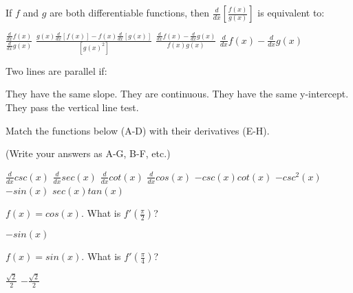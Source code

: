\documentclass[addpoints, 12pt]{exam}%
\newcommand{\spc}{\vspace*{0.5cm}}
\begin{document}
\begin{questions}
\spc

\question[1]

If $f$ and $g$ are both differentiable functions, then $\frac{d}{dx}[\frac{f(x)}{g(x)}]$ is equivalent to:

\begin{choices}
\choice $\frac{\frac{d}{dx}f(x)}{\frac{d}{dx}g(x)}$
\CorrectChoice $\frac{g(x)\frac{d}{dx}[f(x)] - f(x)\frac{d}{dx}[g(x)]}{[g(x)^2]}$
\choice $\frac{\frac{d}{dx}f(x) - \frac{d}{dx}g(x)}{f(x)g(x)}$
\choice $\frac{d}{dx}f(x) - \frac{d}{dx}g(x)$
\end{choices}

\spc

\question[1]

Two lines are parallel if:

\begin{choices}
\CorrectChoice They have the same slope.
\choice They are continuous.
\choice They have the same y-intercept.
\choice They pass the vertical line test. 
\end{choices}

\spc

\question[1]

Match the functions below (A-D) with their derivatives (E-H). 

(Write your answers as A-G, B-F, etc.)

\begin{multicols}{2}
\begin{choices}
\choice $\frac{d}{dx}csc(x)$
\choice $\frac{d}{dx}sec(x)$
\choice $\frac{d}{dx}cot(x)$
\choice $\frac{d}{dx}cos(x)$
\choice $-csc(x)cot(x)$
\choice $-csc^2(x)$
\choice $-sin(x)$
\choice $sec(x)tan(x)$
\end{choices}
\end{multicols}

\spc

\question[1]

$f(x) = cos(x)$. What is $f'(\frac{\pi}{2})$?

\begin{choices}
\choice $-sin(x)$

\end{choices}

\spc

\question[1]

$f(x) = sin(x)$. What is $f'(\frac{\pi}{4})$?

\begin{choices}
\CorrectChoice $\frac{\sqrt{2}}{2}$
\choice $-\frac{\sqrt{2}}{2}$
\end{choices}


\end{questions}
\end{document}
